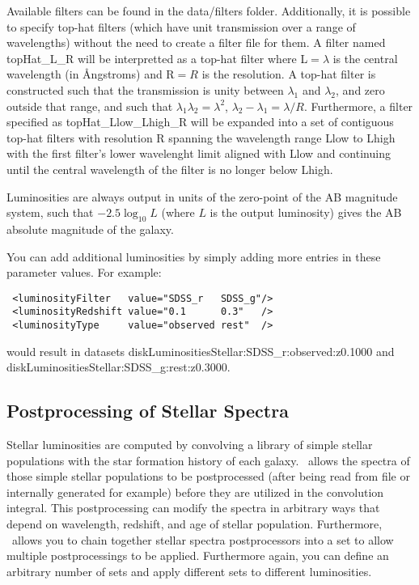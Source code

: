 Available filters can be found in the {\normalfont \ttfamily data/filters} folder. Additionally, it is possible to specify top-hat filters (which have unit transmission over a range of wavelengths) without the need to create a filter file for them. A filter named {\normalfont \ttfamily topHat\_L\_R} will be interpretted as a top-hat filter where {\normalfont \ttfamily L}$=\lambda$ is the central wavelength (in \AA ngstroms) and {\normalfont \ttfamily R}$=R$ is the resolution. A top-hat filter is constructed such that the transmission is unity between $\lambda_1$ and $\lambda_2$, and zero outside that range, and such that $\lambda_1\lambda_2=\lambda^2$, $\lambda_2-\lambda_1=\lambda/R$. Furthermore, a filter specified as {\normalfont \ttfamily topHat\_Llow\_Lhigh\_R} will be expanded into a set of contiguous top-hat filters with resolution {\normalfont \ttfamily R} spanning the wavelength range {\normalfont \ttfamily Llow} to {\normalfont \ttfamily Lhigh} with the first filter's lower wavelenght limit aligned with {\normalfont \ttfamily Llow} and continuing until the central wavelength of the filter is no longer below {\normalfont \ttfamily Lhigh}.

Luminosities are always output in units of the zero-point of the AB magnitude system, such that $-2.5\log_{10}L$ (where $L$ is the output luminosity) gives the AB absolute magnitude of the galaxy.

You can add additional luminosities by simply adding more entries in these parameter values. For example:
\begin{verbatim}
 <luminosityFilter   value="SDSS_r   SDSS_g"/>
 <luminosityRedshift value="0.1      0.3"   />
 <luminosityType     value="observed rest"  />
\end{verbatim}
would result in datasets {\normalfont \ttfamily diskLuminositiesStellar:SDSS\_r:observed:z0.1000} and {\normalfont \ttfamily diskLuminositiesStellar:SDSS\_g:rest:z0.3000}. 

\subsection{Postprocessing of Stellar Spectra}

Stellar luminosities are computed by convolving a library of simple stellar populations with the star formation history of each galaxy. \glc\ allows the spectra of those simple stellar populations to be postprocessed (after being read from file or internally generated for example) before they are utilized in the convolution integral. This postprocessing can modify the spectra in arbitrary ways that depend on wavelength, redshift, and age of stellar population. Furthermore, \glc\ allows you to chain together stellar spectra postprocessors into a set to allow multiple postprocessings to be applied. Furthermore again, you can define an arbitrary number of sets and apply different sets to different luminosities.

